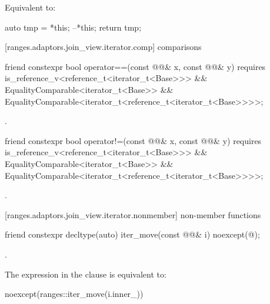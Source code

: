 \begin{itemdescr}
\pnum
\effects Equivalent to:
\begin{codeblock}
auto tmp = *this;
--*this;
return tmp;
\end{codeblock}
\end{itemdescr}

[ranges.adaptors.join_view.iterator.comp]{ comparisons}

\begin{itemdecl}
friend constexpr bool operator==(const @@& x, const @@& y)
  requires is_reference_v<reference_t<iterator_t<Base>>> &&
      EqualityComparable<iterator_t<Base>> &&
      EqualityComparable<iterator_t<reference_t<iterator_t<Base>>>>;
\end{itemdecl}

\begin{itemdescr}
\pnum
\returns {}.
\end{itemdescr}

\begin{itemdecl}
friend constexpr bool operator!=(const @@& x, const @@& y)
  requires is_reference_v<reference_t<iterator_t<Base>>> &&
      EqualityComparable<iterator_t<Base>> &&
      EqualityComparable<iterator_t<reference_t<iterator_t<Base>>>>;
\end{itemdecl}

\begin{itemdescr}
\pnum
\returns {}.
\end{itemdescr}

[ranges.adaptors.join_view.iterator.nonmember]{ non-member functions}

\begin{itemdecl}
friend constexpr decltype(auto) iter_move(const @@& i)
  noexcept(@\seebelow@);
\end{itemdecl}

\begin{itemdescr}
\pnum
\returns {}.

\pnum
\remarks The expression in the  clause is equivalent to:
\begin{codeblock}
noexcept(ranges::iter_move(i.inner_))
\end{codeblock}
\end{itemdescr}

